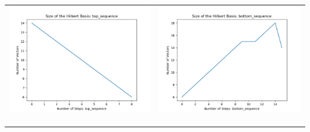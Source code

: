 \documentclass[10pt]{article}
\begin{document}
\begin{tabular}{c|c}
\begin{minipage}{.4\textwidth}
\includegraphics[width=\textwidth]{"DATA/4d/4 generators 2 bound D/top_sequence SIZE"}
\end{minipage} &
\begin{minipage}{.4\textwidth}
\includegraphics[width=\textwidth]{"DATA/4d/4 generators 2 bound D bottomup/bottom_sequence SIZE"}
\end{minipage} \\ \\
\hline \\\begin{minipage}{.4\textwidth}

\end{minipage}
\end{tabular}
\end{document}
